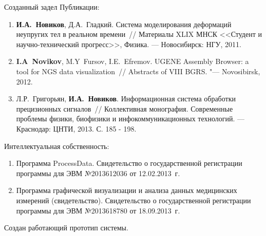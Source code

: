 \documentclass[usenames,dvipsnames,pdftex,unicode,hidelinks]{beamer}
\begin{document}
  \begin{frame}{Созданный задел}
    Публикации:
    {
      \scriptsize
      \begin{enumerate}
        \item
          \textbf{И.А.~Новиков}, Д.А.~Гладкий. Система моделирования деформаций неупругих тел в реальном времени~//
          Материалы XLIX МНСК <<Студент и научно-технический прогресс>>, Физика. --- Новосибирск:
          НГУ, 2011.
        \item
          \textbf{I.A~Novikov}, M.Y~Fursov, I.E.~Efremov. UGENE Assembly Browser: a tool for NGS data
          visualization~// Abstracts of VIII BGRS. "--- Novosibirsk, 2012.
        \item
          Л.Р.~Григорьян, \textbf{И.А.~Новиков}. Информационная система обработки прецизионных сигналов~//
          Коллективная монография. Современные проблемы физики, биофизики и инфокоммуникационных технологий.
          --- Краснодар: ЦНТИ, 2013. С. 185 - 198.
      \end{enumerate}
    }
    Интеллектуальная собственность:
    {
      \scriptsize
      \begin{enumerate}
        \item
          Программа ProcessData. Свидетельство о государственной регистрации программы
          для ЭВМ №2013612036 от 12.02.2013~г.
        \item
          Программа графической визуализации и анализа данных медицинских измерений (свидетельство).
          Свидетельство о государственной регистрации программы для ЭВМ №2013618780 от 18.09.2013~г.
      \end{enumerate}
    }
    Создан работающий прототип системы.
  \end{frame}
\end{document}
